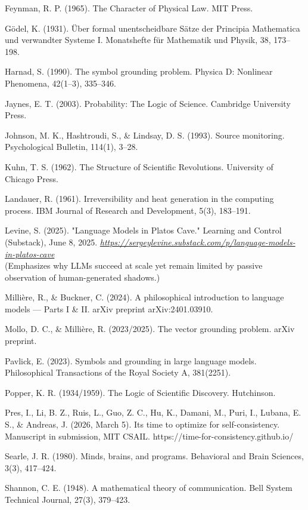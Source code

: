 \documentclass[12pt]{article}
\begin{document}
Feynman, R. P. (1965). The Character of Physical Law. MIT Press.

Gödel, K. (1931). Über formal unentscheidbare Sätze der Principia
Mathematica und verwandter Systeme I. Monatshefte für Mathematik und
Physik, 38, 173--198.

Harnad, S. (1990). The symbol grounding problem. Physica D: Nonlinear
Phenomena, 42(1--3), 335--346.

Jaynes, E. T. (2003). Probability: The Logic of Science. Cambridge
University Press.

Johnson, M. K., Hashtroudi, S., \& Lindsay, D. S. (1993). Source
monitoring. Psychological Bulletin, 114(1), 3--28.

Kuhn, T. S. (1962). The Structure of Scientific Revolutions. University
of Chicago Press.

Landauer, R. (1961). Irreversibility and heat generation in the
computing process. IBM Journal of Research and Development, 5(3),
183--191.

Levine, S. (2025). "Language Models in Plato\textquotesingle s Cave."
Learning and Control (Substack), June 8, 2025.
\href{https://sergeylevine.substack.com/p/language-models-in-platos-cave}{\textit{https://sergeylevine.substack.com/p/language-models-in-platos-cave\\
}}(Emphasizes why LLMs succeed at scale yet remain limited by passive
observation of human-generated shadows.)

Millière, R., \& Buckner, C. (2024). A philosophical introduction to
language models --- Parts I \& II. arXiv preprint arXiv:2401.03910.

Mollo, D. C., \& Millière, R. (2023/2025). The vector grounding problem.
arXiv preprint.

Pavlick, E. (2023). Symbols and grounding in large language models.
Philosophical Transactions of the Royal Society A, 381(2251).

Popper, K. R. (1934/1959). The Logic of Scientific Discovery.
Hutchinson.

Pres, I., Li, B. Z., Ruis, L., Guo, Z. C., Hu, K., Damani, M., Puri, I.,
Lubana, E. S., \& Andreas, J. (2026, March 5). It\textquotesingle s time
to optimize for self-consistency. Manuscript in submission, MIT CSAIL.
https://time-for-consistency.github.io/

Searle, J. R. (1980). Minds, brains, and programs. Behavioral and Brain
Sciences, 3(3), 417--424.

Shannon, C. E. (1948). A mathematical theory of communication. Bell
System Technical Journal, 27(3), 379--423.
\end{document}
